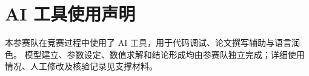 \section*{AI 工具使用声明}
本参赛队在竞赛过程中使用了 AI 工具，用于代码调试、论文撰写辅助与语言润色。
模型建立、参数设定、数值求解和结论形成均由参赛队独立完成；详细使用情况、人工修改及核验记录见支撑材料。
